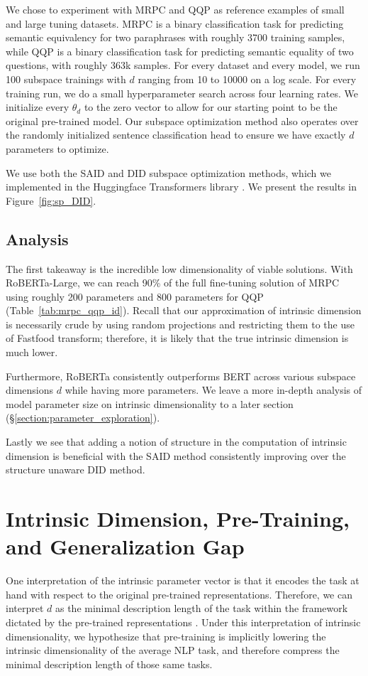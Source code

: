 We chose to experiment with MRPC \citep{mrpc} and QQP \citep{qqp} as reference examples of small and large tuning datasets. MRPC is a binary classification task for predicting semantic equivalency for two paraphrases with roughly 3700 training samples, while QQP is a binary classification task for predicting semantic equality of two questions, with roughly 363k samples. For every dataset and every model, we run 100 subspace trainings with $d$ ranging from 10 to 10000 on a log scale. For every training run, we do a small hyperparameter search across four learning rates. We initialize every $\theta_d$ to the zero vector to allow for our starting point to be the original pre-trained model. Our subspace optimization method also operates over the randomly initialized sentence classification head to ensure we have exactly $d$ parameters to optimize.

We use both the SAID and DID subspace optimization methods, which we implemented in the Huggingface Transformers library \citep{huggingface}. We present the results in Figure~\ref{fig:sp_DID}. 

\subsection{Analysis}
The first takeaway is the incredible low dimensionality of viable solutions. With RoBERTa-Large, we can reach 90\% of the full fine-tuning solution of MRPC using roughly 200 parameters and 800 parameters for QQP (Table~\ref{tab:mrpc_qqp_id}). Recall that our approximation of intrinsic dimension is necessarily crude by using random projections and restricting them to the use of Fastfood transform; therefore, it is likely that the true intrinsic dimension is much lower.

Furthermore, RoBERTa consistently outperforms BERT across various subspace dimensions $d$ while having more parameters. We leave a more in-depth analysis of model parameter size on intrinsic dimensionality to a later section (\S\ref{section:parameter_exploration}).

Lastly we see that adding a notion of structure in the computation of intrinsic dimension is beneficial with the SAID method consistently improving over the structure unaware DID method.

\section{Intrinsic Dimension, Pre-Training, and Generalization Gap} One interpretation of the intrinsic parameter vector is that it encodes the task at hand with respect to the original pre-trained representations. Therefore, we can interpret $d$ as the minimal description length of the task within the framework dictated by the pre-trained representations \citep{min_desc_length}. Under this interpretation of intrinsic dimensionality, we hypothesize that pre-training is implicitly lowering the intrinsic dimensionality of the average NLP task, and therefore compress the minimal description length of those same tasks.

